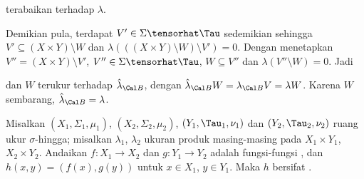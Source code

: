 {\noindent terabaikan terhadap $\lambda$.\ \Qed

Demikian pula, terdapat $V'\in\Sigma\tensorhat\Tau$ sedemikian sehingga
$V'\subseteq(X\times Y)\setminus W$ dan
$\lambda(((X\times Y)\setminus W)\setminus V')=0$. Dengan menetapkan $V''=(X\times Y)\setminus V'$,
$V''\in\Sigma\tensorhat\Tau$, $W\subseteq V''$ dan
$\lambda(V''\setminus W)=0$. Jadi


\noindent dan $W$ terukur terhadap $\hat\lambda_{\Cal B}$, dengan
$\hat\lambda_{\Cal B}W=\lambda_{\Cal B}V=\lambda W$. Karena $W$
sembarang, $\hat\lambda_{\Cal B}=\lambda$.
}%

Misalkan $(X_1,\Sigma_1,\mu_1)$, $(X_2,\Sigma_2,\mu_2)$,
$(Y_1,\Tau_1,\nu_1)$ dan $(Y_2,\Tau_2,\nu_2)$ ruang ukur
$\sigma$-hingga; misalkan
$\lambda_1$, $\lambda_2$ ukuran produk masing-masing pada $X_1\times Y_1$,
$X_2\times Y_2$. Andaikan $f:X_1\to X_2$ dan
$g:Y_1\to Y_2$ adalah fungsi-fungsi \imp, dan
$h(x,y)=(f(x),g(y))$ untuk $x\in X_1$, $y\in Y_1$. Maka $h$ bersifat \imp.

